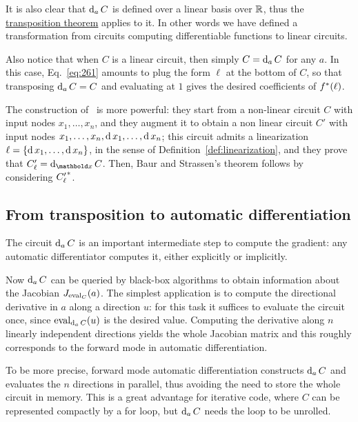 It is also clear that $\operatorname{d}_aC$ is defined over a linear basis over
$\mathbb{R}$, thus the \hyperref[th:tellegen]{transposition theorem} applies
to it. In other words we have defined a transformation from circuits
computing differentiable functions to linear circuits.

Also notice that when $C$ is a linear circuit, then simply
$C=\operatorname{d}_aC$ for any $a$. In this case, Eq.~\eqref{eq:261} amounts to
plug the form $\ell$ at the bottom of $C$, so that transposing
$\operatorname{d}_aC=C$ and evaluating at $1$ gives the desired coefficients of
$f^\ast(\ell)$.


\begin{nota}
  The construction of~\cite{gashkov+gashkov05} is more powerful: they
  start from a non-linear circuit $C$ with input nodes
  $x_1,\ldots,x_n$, and they augment it to obtain a non linear circuit
  $C'$ with input nodes $x_1,\ldots,x_n,\operatorname{d} x_1,\ldots,\operatorname{d} x_n$;
  this circuit admits a linearization $\ell=\{\operatorname{d} x_1,\ldots,\operatorname{d}
  x_n\}$, in the sense of Definition~\ref{def:linearization}, and they
  prove that $C'_\ell=\diff_{\lst{x}} C$. Then, Baur and Strassen's theorem
  follows by considering ${C'_\ell}^\ast$.
\end{nota}



\subsection{From transposition to automatic differentiation}
\label{sec:from-transp-autom}
The circuit $\operatorname{d}_a C$ is an important intermediate step to compute
the gradient: any automatic differentiator computes it, either
explicitly or implicitly.

Now $\operatorname{d}_aC$ can be queried by black-box algorithms to obtain
information about the Jacobian $J_{\operatorname{eval}_C}(a)$. The simplest
application is to compute the directional derivative in $a$ along a
direction $u$: for this task it suffices to evaluate the circuit once,
since $\operatorname{eval}_{\operatorname{d}_aC}(u)$ is the desired value. Computing the
derivative along $n$ linearly independent directions yields the whole
Jacobian matrix and this roughly corresponds to the forward mode in
automatic differentiation.

\begin{remark}
  To be more precise, forward mode automatic differentiation constructs
  $\operatorname{d}_aC$ and evaluates the $n$ directions in parallel, thus
  avoiding the need to store the whole circuit in memory. This is a
  great advantage for iterative code, where $C$ can be represented
  compactly by a for loop, but $\operatorname{d}_a C$ needs the loop to be
  unrolled.
\end{remark}

